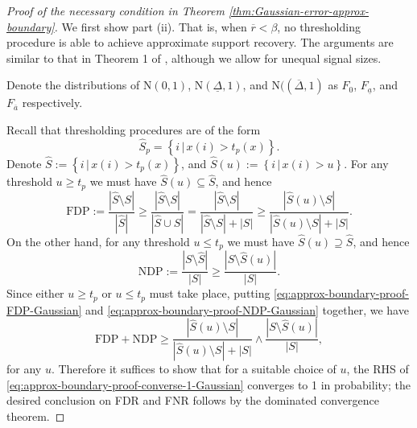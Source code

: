 \begin{proof}[Proof of the necessary condition in Theorem \ref{thm:Gaussian-error-approx-boundary}]
We first show part {\rm (ii)}.  That is, when $\overline{r} < \beta$, no thresholding procedure is able to achieve approximate support recovery.
The arguments are similar to that in Theorem 1 of \cite{arias2017distribution}, although we allow for unequal signal sizes. 

Denote the distributions of $\mathrm{N}(0,1)$, $\mathrm{N}(\underline{\Delta}, 1)$, and $\mathrm{N}((\overline{\Delta}, 1)$ as $F_0$, $F_{\underline{a}}$, and $F_{\overline{a}}$ respectively.


Recall that thresholding procedures are of the form
$$
\widehat{S}_p = \left\{i\,|\,x(i) > t_p(x)\right\}.
$$
Denote $\widehat{S} := \left\{i\,|\,x(i) > t_p(x)\right\}$, and $\widehat{S}(u) := \left\{i\,|\,x(i) > u\right\}$.
For any threshold $u\ge t_p$ we must have $\widehat{S}(u)\subseteq\widehat{S}$, and hence
\begin{equation} \label{eq:approx-boundary-proof-FDP-Gaussian}
    \text{FDP} := \frac{|\widehat{S}\setminus{S}|}{|\widehat{S}|} \ge \frac{|\widehat{S}\setminus{S}|}{|\widehat{S}\cup{S}|} = \frac{|\widehat{S}\setminus{S}|}{|\widehat{S}\setminus{S}| + |S|} \ge
    \frac{|\widehat{S}(u)\setminus{S}|}{|\widehat{S}(u)\setminus{S}| + |S|}.
\end{equation}
On the other hand, for any threshold $u\le t_p$ we must have $\widehat{S}(u)\supseteq\widehat{S}$, and hence
\begin{equation} \label{eq:approx-boundary-proof-NDP-Gaussian}
    \text{NDP} := \frac{|{S}\setminus\widehat{S}|}{|{S}|} \ge 
    \frac{|{S}\setminus\widehat{S}(u)|}{|{S}|}.
\end{equation}
Since either $u\ge t_p$ or  $u\le t_p$ must take place, putting \eqref{eq:approx-boundary-proof-FDP-Gaussian} and \eqref{eq:approx-boundary-proof-NDP-Gaussian} together, we have
\begin{equation} \label{eq:approx-boundary-proof-converse-1-Gaussian}
    \text{FDP} + \text{NDP} 
    \ge \frac{|\widehat{S}(u)\setminus{S}|}{|\widehat{S}(u)\setminus{S}|+|{S}|} \wedge \frac{|{S}\setminus\widehat{S}(u)|}{|{S}|},
\end{equation}
for any $u$.
Therefore it suffices to show that for a suitable choice of $u$, the RHS of \eqref{eq:approx-boundary-proof-converse-1-Gaussian} converges to 1 in probability; the desired conclusion on FDR and FNR follows by the dominated convergence theorem.


\end{proof}
